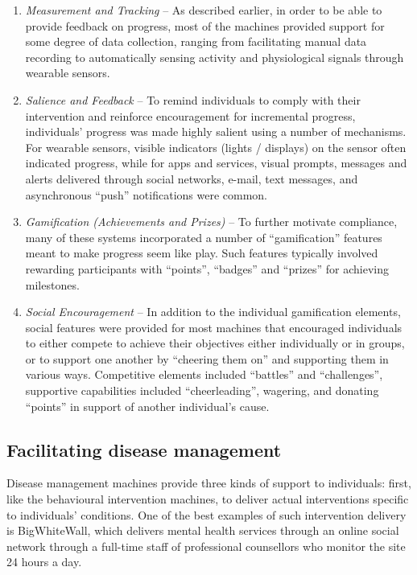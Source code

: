 \documentclass{sig-alternate}
\begin{document}
\begin{enumerate}
\item \emph{Measurement and Tracking} -- As described earlier, in order
  to be able to provide feedback on progress, most of the machines
  provided support for some degree of data collection, ranging from
  facilitating manual data recording to automatically sensing activity
  and physiological signals through wearable sensors.
\item \emph{Salience and Feedback} -- To remind individuals to comply
  with their intervention and reinforce encouragement for incremental
  progress, individuals' progress was made highly salient using a
  number of mechanisms.  For wearable sensors, visible indicators
  (lights / displays) on the sensor often indicated progress, while for
  apps and services, visual prompts, messages and alerts delivered
  through social networks, e-mail, text messages, and asynchronous
  ``push'' notifications were common.
\item \emph{Gamification (Achievements and Prizes)} -- To further
  motivate compliance, many of these systems incorporated a number of
  ``gamification'' features \cite{Deterding:2011:GUG:1979742.1979575}
  meant to make progress seem like play.  Such features typically
  involved rewarding participants with ``points'', ``badges'' and
  ``prizes'' for achieving milestones.
\item \emph{Social Encouragement} -- In addition to the individual
  gamification elements, social features were provided for most
  machines that encouraged individuals to either compete to achieve
  their objectives either individually or in groups, or to support one
  another by ``cheering them on'' and supporting them in various ways.
  Competitive elements included ``battles'' and ``challenges'', supportive
  capabilities included ``cheerleading'', wagering, and donating ``points''
  in support of another individual's cause.
\end{enumerate}

\subsection{Facilitating disease management}
Disease management machines provide three kinds of support to
individuals: first, like the behavioural intervention machines, to
deliver actual interventions specific to individuals' conditions.  One
of the best examples of such intervention delivery is BigWhiteWall,
which delivers mental health services through an online social network
through a full-time staff of professional counsellors who monitor the
site 24 hours a day.
\end{document}
